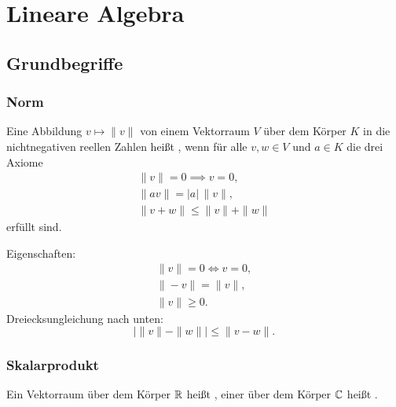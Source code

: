 
\chapter{Lineare Algebra}
\section{Grundbegriffe}
\subsection{Norm}
\begin{definition}[Norm]
Eine Abbildung $v\mapsto\|v\|$ von einem
Vektorraum $V$ über dem Körper $K$ in die nichtnegativen reellen
Zahlen heißt , wenn für alle $v,w\in V$ und $a\in K$
die drei Axiome%
\begin{gather}
\|v\|=0 \implies v=0,\\
\|av\| = |a|\,\|v\|,\\
\|v+w\| \le \|v\|+\|w\|
\end{gather}
erfüllt sind.
\end{definition}

Eigenschaften:
\begin{gather}
\|v\|=0\iff v=0,\\
\|-v\|=\|v\|,\\
\|v\|\ge 0.
\end{gather}
Dreiecksungleichung nach unten:
\begin{equation}
|\|v\|-\|w\||\le \|v-w\|.
\end{equation}

\subsection{Skalarprodukt}

Ein Vektorraum über dem Körper $\mathbb R$ heißt ,
einer über dem Körper $\mathbb C$ heißt .

